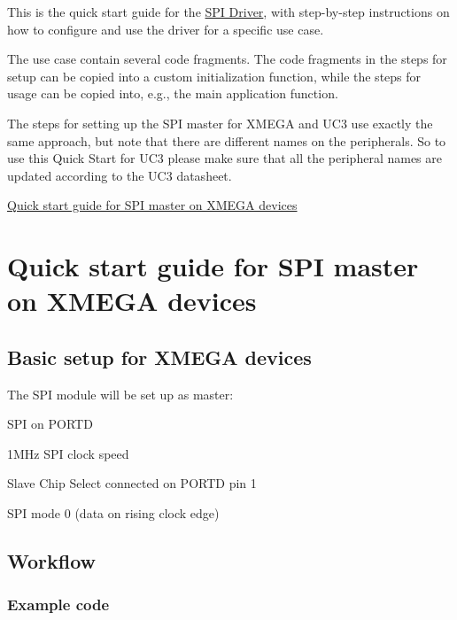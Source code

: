 This is the quick start guide for the \hyperlink{group__spi__group}{S\-P\-I Driver}, with step-\/by-\/step instructions on how to configure and use the driver for a specific use case.

The use case contain several code fragments. The code fragments in the steps for setup can be copied into a custom initialization function, while the steps for usage can be copied into, e.\-g., the main application function.

The steps for setting up the S\-P\-I master for X\-M\-E\-G\-A and U\-C3 use exactly the same approach, but note that there are different names on the peripherals. So to use this Quick Start for U\-C3 please make sure that all the peripheral names are updated according to the U\-C3 datasheet.
\begin{DoxyItemize}
\item \hyperlink{spi_master_xmega}{Quick start guide for S\-P\-I master on X\-M\-E\-G\-A devices} 
\end{DoxyItemize}\hypertarget{spi_master_xmega}{}\section{Quick start guide for S\-P\-I master on X\-M\-E\-G\-A devices}\label{spi_master_xmega}
\hypertarget{spi_master_xmega_spi_master_xmega_basic}{}\subsection{Basic setup for X\-M\-E\-G\-A devices}\label{spi_master_xmega_spi_master_xmega_basic}
The S\-P\-I module will be set up as master\-:
\begin{DoxyItemize}
\item S\-P\-I on P\-O\-R\-T\-D
\item 1\-M\-Hz S\-P\-I clock speed
\item Slave Chip Select connected on P\-O\-R\-T\-D pin 1
\item S\-P\-I mode 0 (data on rising clock edge)
\end{DoxyItemize}\hypertarget{spi_master_xmega_spi_master_xmega_basic_setup}{}\subsection{Workflow}\label{spi_master_xmega_spi_master_xmega_basic_setup}
\hypertarget{spi_master_xmega_spi_master_xmega_basic_setup_code}{}\subsubsection{Example code}\label{spi_master_xmega_spi_master_xmega_basic_setup_code}
